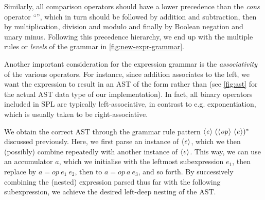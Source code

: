 Similarly, all comparison operators should have a lower precedence than the
\emph{cons} operator ``\code{:}'', which in turn should be followed by addition
and subtraction, then by multiplication, division and modulo and finally by
Boolean negation and unary minus.
Following this precedence hierarchy, we end up with the multiple rules or
\emph{levels} of the grammar in \cref{fig:new-expr-grammar}.


Another important consideration for the expression grammar is the
\emph{associativity} of the various operators. For instance, since addition
associates to the left, we want the expression  to result in an AST
of the form  rather than  (see
\cref{fig:ast} for the actual AST data type of our implementation).
In fact, all binary operators included in SPL are typically left-associative, in
contrast to e.g. exponentiation, which is usually taken to be right-associative.

We obtain the correct AST through the grammar rule pattern
$\langle \textit{e}\kern.7pt \rangle\ (\langle \textit{op}\kern.7pt \rangle\ \langle \textit{e}\kern.7pt \rangle)^*$ discussed previously.
Here, we first parse an instance of $\langle \textit{e}\kern.7pt \rangle$, which we then (possibly) combine
repeatedly with another instance of $\langle \textit{e}\kern.7pt \rangle$. This way, we can use an
accumulator $a$, which we initialise with the leftmost subexpression
$e_1$, then replace by $a = op\ e_1\ e_2$, then to $a = op\ a\ e_3$, and so
forth. By successively combining the (nested) expression parsed thus far with
the following subexpression, we achieve the desired left-deep nesting of the
AST.


